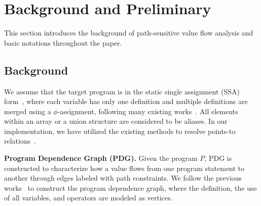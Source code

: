\section{Background and Preliminary}
\label{sec:problem-formu}

This section introduces the background of path-sensitive value flow analysis and basic notations throughout the paper.
\vspace{-0.7em}
\subsection{Background}
We assume that the target program is in the static single assignment (SSA) form~\cite{cytron1991efficiently}, where each variable has only one definition and multiple definitions are merged using a $\phi$-assignment, following many existing works~\cite{babic2008calysto, cadar2008klee, shi2018pinpoint, sui2016svf, sui2014detecting, xie2005scalable}.
All elements within an array or a union structure are considered to be aliases.
In our implementation,  we have utilized the existing methods to resolve points-to relations~\cite{shi2018pinpoint}.

\textbf{Program Dependence Graph (PDG).}
Given the program $P$, PDG is constructed to characterize how a value flows from one program statement to another through edges labeled with path constraints.
We follow the previous works~\cite{sui2016svf, sui2014detecting, shi2018pinpoint} to construct the program dependence graph, where the definition, the use of all variables, and operators are modeled as vertices.




